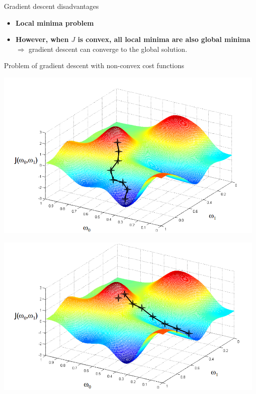 \documentclass[serif, aspectratio=169]{beamer}
\begin{document}
\begin{frame}{Gradient descent disadvantages}

    \begin{itemize}
        \item \textbf{Local minima problem}
        
        \item \textbf{However, when \( J \) is convex, all local minima are also global minima} \(\Rightarrow\) gradient descent can converge to the global solution.
    \end{itemize}

\end{frame}

\begin{frame}{Problem of gradient descent with non-convex cost functions}

    \begin{minipage}{0.48\textwidth}
        \centering
        \includegraphics[width=\textwidth]{pic/7.png}
    \end{minipage}%
    \begin{minipage}{0.48\textwidth}
        \centering
        \includegraphics[width=\textwidth]{pic/8.png}
    \end{minipage}
    \vfill

\end{frame}
\end{document}
